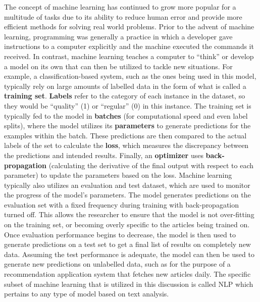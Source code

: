 The concept of machine learning has continued to grow more popular for a multitude of tasks due to its ability to reduce human error and provide more efficient methods for solving real world problems. Prior to the advent of machine learning, programming was generally a practice in which a developer gave instructions to a computer explicitly and the machine executed the commands it received. In contrast, machine learning teaches a computer to “think” or develop a model on its own that can then be utilized to tackle new situations. For example, a classification-based system, such as the ones being used in this model, typically rely on large amounts of labelled data in the form of what is called a \textbf{training set}. \textbf{Labels} refer to the category of each instance in the dataset, so they would be “quality” (1) or “regular” (0) in this instance. The training set is typically fed to the model in \textbf{batches} (for computational speed and even label splits), where the model utilizes its \textbf{parameters} to generate predictions for the examples within the batch. These predictions are then compared to the actual labels of the set to calculate the \textbf{loss}, which measures the discrepancy between the predictions and intended results. Finally, an \textbf{optimizer} uses \textbf{back-propagation} (calculating the derivative of the final output with respect to each parameter) to update the parameters based on the loss. Machine learning typically also utilizes an evaluation and test dataset, which are used to monitor the progress of the model’s parameters. The model generates predictions on the evaluation set with a fixed frequency during training with back-propagation turned off. This allows the researcher to ensure that the model is not over-fitting on the training set, or becoming overly specific to the articles being trained on. Once evaluation performance begins to decrease, the model is then used to generate predictions on a test set to get a final list of results on completely new data. Assuming the test performance is adequate, the model can then be used to generate new predictions on unlabelled data, such as for the purpose of a recommendation application system that fetches new articles daily. The specific subset of machine learning that is utilized in this discussion is called \gls{NLP} which pertains to any type of model based on text analysis.